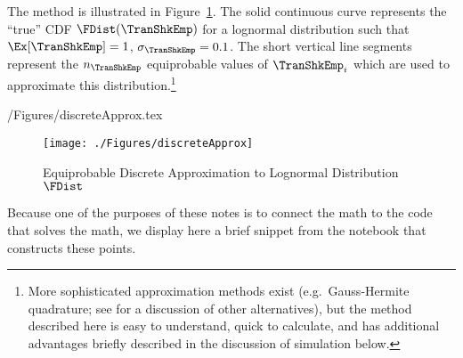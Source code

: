 \documentclass[\econtexRoot/SolvingMicroDSOPs]{subfiles}
\begin{document}
The method is illustrated in Figure~\ref{fig:discreteapprox}.  The solid continuous curve represents
the ``true'' CDF $\FDist(\TranShkEmp)$ for a lognormal distribution such that $\Ex[\TranShkEmp] = 1$, $\sigma_{\TranShkEmp} = 0.1$.  The short vertical line segments represent the $n_{\TranShkEmp}$
equiprobable values of $\TranShkEmp_{i}$ which are used to approximate this
distribution.\footnote{More sophisticated approximation methods exist
  (e.g.\ Gauss-Hermite quadrature; see \cite{kopecky2010finite} for a discussion of other alternatives), but the method described here is easy to understand, quick to calculate, and has additional advantages briefly described in the discussion of simulation below.}
\begin{verbatimwrite}{\econtexRoot/Figures/discreteApprox.tex}
  \hypertarget{discreteApprox}{}
  \begin{figure}
    \texttt{[image: ./Figures/discreteApprox]}
    \caption{Equiprobable Discrete Approximation to Lognormal Distribution $\FDist$}
    \label{fig:discreteapprox}
  \end{figure}
\end{verbatimwrite}
\unskip

Because one of the purposes of these notes is to connect the math to the code that solves the math, we display here a brief snippet from the notebook that constructs these points.


\lstset{basicstyle=\ttfamily\footnotesize,breaklines=true,language=Python,frame=single}

\end{document}
